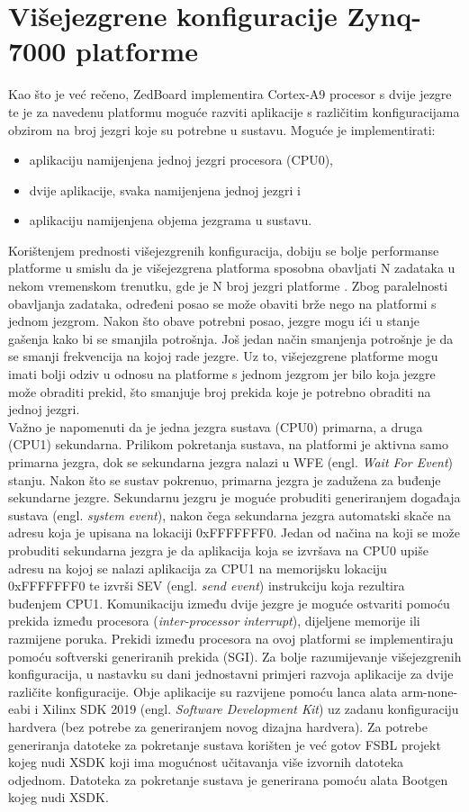 \documentclass[times, utf8, diplomski, numeric]{fer}
\begin{document}
\chapter{Višejezgrene konfiguracije Zynq-7000 platforme}
Kao što je već rečeno, ZedBoard implementira Cortex-A9 procesor s dvije jezgre te je za navedenu
platformu moguće razviti aplikacije s različitim konfiguracijama obzirom na broj jezgri koje su potrebne
u sustavu. Moguće je implementirati:
\begin{itemize}
  \item{aplikaciju namijenjena jednoj jezgri procesora (CPU0),}
  \item{dvije aplikacije, svaka namijenjena jednoj jezgri i}
  \item{aplikaciju namijenjena objema jezgrama u sustavu.}
\end{itemize}
Korištenjem prednosti višejezgrenih konfiguracija, dobiju se bolje performanse platforme u smislu da je višejezgrena platforma
sposobna obavljati N zadataka u nekom vremenskom trenutku, gde je N broj jezgri platforme \cite{cortexa_pg}. Zbog paralelnosti
obavljanja zadataka, određeni posao se može obaviti brže nego na platformi s jednom jezgrom. Nakon što obave potrebni posao,
jezgre mogu ići u stanje gašenja kako bi se smanjila potrošnja. Još jedan način smanjenja potrošnje je da se smanji frekvencija
na kojoj rade jezgre. Uz to, višejezgrene platforme mogu imati bolji odziv u odnosu na platforme s jednom jezgrom jer bilo koja
jezgre može obraditi prekid, što smanjuje broj prekida koje je potrebno obraditi na jednoj jezgri.\\
Važno je napomenuti da je jedna jezgra sustava (CPU0) primarna, a druga (CPU1) sekundarna. Prilikom
pokretanja sustava, na platformi je aktivna samo primarna jezgra, dok se sekundarna jezgra nalazi u
WFE (engl. \textit{Wait For Event}) stanju. Nakon što se sustav pokrenuo, primarna jezgra je zadužena
za buđenje sekundarne jezgre. Sekundarnu jezgru je moguće probuditi generiranjem događaja sustava
(engl. \textit{system event}), nakon čega sekundarna jezgra automatski skače na adresu koja je upisana
na lokaciji 0xFFFFFFF0. Jedan od načina na koji se može probuditi sekundarna jezgra je da aplikacija
koja se izvršava na CPU0 upiše adresu na kojoj se nalazi aplikacija za CPU1 na memorijsku lokaciju
0xFFFFFFF0 te izvrši SEV (engl. \textit{send event}) instrukciju koja rezultira buđenjem CPU1.
Komunikaciju između dvije jezgre je moguće ostvariti pomoću prekida između procesora
(\textit{inter-processor interrupt}), dijeljene memorije ili razmijene poruka. Prekidi između procesora
na ovoj platformi se implementiraju pomoću softverski generiranih prekida (SGI). Za bolje razumijevanje
višejezgrenih konfiguracija, u nastavku su dani jednostavni primjeri razvoja aplikacije za dvije različite
konfiguracije. Obje aplikacije su razvijene pomoću lanca alata arm-none-eabi i Xilinx SDK 2019 (engl.
\textit{Software Development Kit}) uz zadanu konfiguraciju hardvera (bez potrebe za generiranjem
novog dizajna hardvera). Za potrebe generiranja datoteke za pokretanje sustava korišten je već gotov FSBL projekt
kojeg nudi XSDK koji ima mogućnost učitavanja više izvornih datoteka odjednom. Datoteka za pokretanje sustava je
generirana pomoću alata Bootgen kojeg nudi XSDK.
\end{document}
